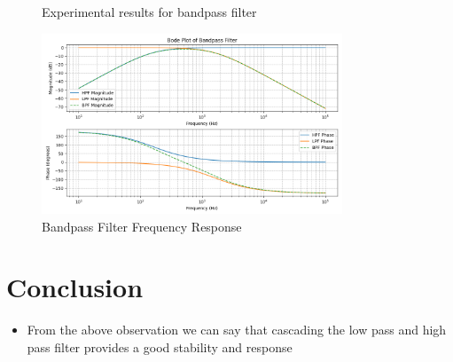\documentclass{article}
\begin{document}
\begin{figure}[H]
    \centering
    \hfill
\end{figure}
\begin{figure}[H]
    \centering
    \hfill
    \caption{Experimental results for bandpass filter}
\end{figure}

\begin{figure}[H]
    \centering
    \includegraphics[width=0.8\textwidth]{figs/bandpass.png}
    \caption{Bandpass Filter Frequency Response}
\end{figure}
\section{Conclusion}
\begin{itemize}
    \item From the above observation we can say that cascading the low pass and high pass filter provides a good stability and response
\end{itemize}
\end{document}
